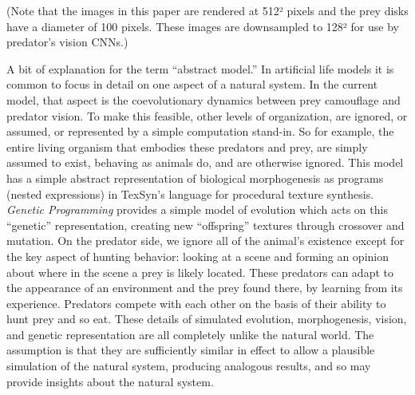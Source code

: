\documentclass[acmtog]{acmart}
\begin{document}
\par
(Note that the images in this paper are rendered at 512² pixels and the prey disks have a diameter of 100 pixels. These images are downsampled to 128² for use by predator's vision CNNs.)
\par
A bit of explanation for the term “abstract model.” In artificial life models it is common to focus in detail on one aspect of a natural system. In the current model, that aspect is the coevolutionary dynamics between prey camouflage and predator vision. To make this feasible, other levels of organization, are ignored, or assumed, or represented by a simple computation stand-in. So for example, the entire living organism that embodies these predators and prey, are simply assumed to exist, behaving as animals do, and are otherwise ignored. This model has a simple abstract representation of biological morphogenesis as programs (nested expressions) in TexSyn's language for procedural texture synthesis. \textit{Genetic Programming} provides a simple model of evolution which acts on this “genetic” representation, creating new “offspring” textures through crossover and mutation. On the predator side, we ignore all of the animal's existence except for the key aspect of hunting behavior: looking at a scene and forming an opinion about where in the scene a prey is likely located. These predators can adapt to the appearance of an environment and the prey found there, by learning from its experience. Predators compete with each other on the basis of their ability to hunt prey and so eat. These details of simulated evolution, morphogenesis, vision, and genetic representation are all completely unlike the natural world. The assumption is that they are sufficiently similar in effect to allow a plausible simulation of the natural system, producing analogous results, and so may provide insights about the natural system.
\par

\end{document}
